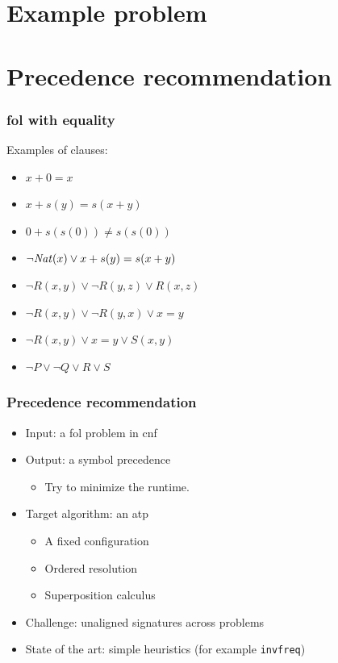 \documentclass[a4paper]{beamer}
\author[F. Bártek]{Filip Bártek}
\title{\DissertationTitle}
\institute[\FacultyAndUniversityAbbr]{\University}
\date{\DTMdate{2022-03-23}}
\begin{document}
\begin{frame}
\titlepage
\end{frame}

\section{Example problem}



\section{Precedence recommendation}

\begin{frame}
\frametitle{\Gls{fol} with equality}
Examples of clauses:
\begin{itemize}
\item $x + 0 = x$
\item $x + s(y) = s(x + y)$
\item $0 + s(s(0)) \neq s(s(0))$
\item $\lnot \mathit{Nat}(x) \lor x + s(y) = s(x + y)$
\item $\lnot R(x, y) \lor \lnot R(y, z) \lor R(x, z)$
\item $\lnot R(x, y) \lor \lnot R(y, x) \lor x = y$
\item $\lnot R(x, y) \lor x = y \lor S(x, y)$
\item $\lnot P \lor \lnot Q \lor R \lor S$
\end{itemize}
\end{frame}

\begin{frame}
\frametitle{Precedence recommendation}
\begin{itemize}
\item Input: a \gls{fol} problem in \gls{cnf}
\item Output: a symbol precedence
\begin{itemize}
\item Try to minimize the runtime.
\end{itemize}
\item Target algorithm: an \acrfull{atp}
\begin{itemize}
\item A fixed configuration
\item Ordered resolution
\item Superposition calculus
\end{itemize}
\item Challenge: unaligned signatures across problems
\item State of the art: simple heuristics (for example \texttt{invfreq})
\end{itemize}
\end{frame}
\end{document}
